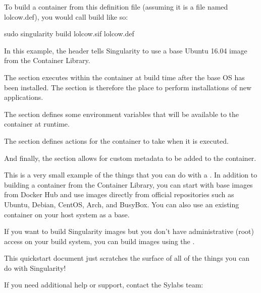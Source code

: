 \documentclass[letterpaper,10pt,english]{sphinxmanual}
\begin{document}
To build a container from this definition file (assuming it is a file
named lolcow.def), you would call build like so:

%
\begin{sphinxVerbatim}[commandchars=\\\{\}]
\PYGZdl{} sudo singularity build lolcow.sif lolcow.def
\end{sphinxVerbatim}

In this example, the header tells Singularity to use a base Ubuntu 16.04 image
from the Container Library.

The  section executes within the container at build time after the base
OS has been installed. The  section is therefore the place to perform
installations of new applications.

The  section defines some environment variables that will be
available to the container at runtime.

The  section defines actions for the container to take when it is
executed.

And finally, the  section allows for custom metadata to be added to
the container.

This is a very small example of the things that you can do with a .
In addition to building a container from the Container Library, you can start
with base images from Docker Hub and use images directly from official
repositories such as Ubuntu, Debian, CentOS, Arch, and BusyBox.  You can also
use an existing container on your host system as a base.

If you want to build Singularity images but you don’t have administrative (root)
access on your build system, you can build images using the .

This quickstart document just scratches the surface of all of the things you can
do with Singularity!

If you need additional help or support, contact the Sylabs team:



\renewcommand{\indexname}{Index}
\printindex
\end{document}
